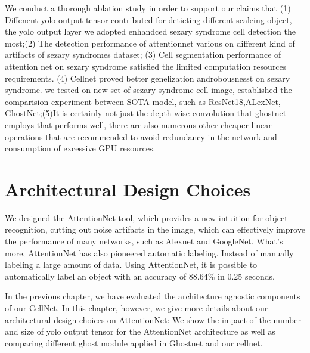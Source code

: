 We conduct a thorough ablation study in order to support our claims that (1)   Diffenent yolo output tensor contributed for  deticting different scaleing object, the yolo output layer we adopted enhandced sezary syndrome cell detection the most;(2) The detection performance of attentionnet  various on different kind of artifacts of sezary syndromes dataset; (3) Cell segmentation performance of attention net  on sezary syndrome satisfied the limited computation resources requirements. 
(4) Cellnet proved better genelization androbousnesst on sezary syndrome.  we  tested on new set of sezary syndrome cell image, established the comparision experiment between SOTA model, such as ResNet18,ALexNet, GhostNet;(5)It is certainly not just the depth wise convolution that ghostnet employs that performs well, there are also numerous other cheaper linear operations that are recommended to avoid redundancy in the network and consumption of excessive GPU resources.


\section{Architectural Design Choices}
\label{sec:lorem}

We designed the AttentionNet tool, which provides a new intuition for object recognition, cutting out noise artifacts in the image, which can effectively improve the performance of many networks, such as Alexnet and GoogleNet. What’s more, AttentionNet has also pioneered automatic labeling. Instead of manually labeling a large amount of data. Using AttentionNet, it is possible to automatically label an object with an accuracy of 88.64\% in 0.25 seconds. 


In the previous chapter, we have evaluated the architecture agnostic components of our
CellNet. In this chapter, however, we give more details about our architectural design
choices on AttentionNet: We show the impact of the number and size of yolo output tensor for the AttentionNet architecture as well as comparing different ghost module applied in Ghostnet \cite{19} and our cellnet.



